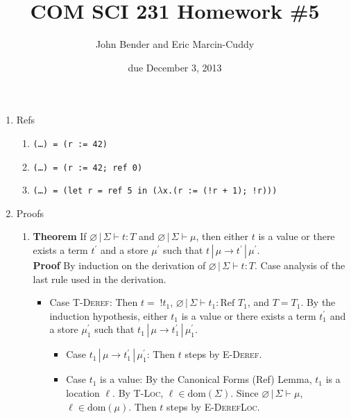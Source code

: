 \documentclass[12pt,letterpaper]{article}
\title{COM SCI 231 Homework \#5}
\author{John Bender and Eric Marcin-Cuddy}
\date{due December 3, 2013}
\begin{document}
\maketitle

\begin{enumerate}

  \item Refs
    \begin{enumerate}
      \item \texttt{(\ldots ) = (r := 42)}

      \item \texttt{(\ldots ) = (r := 42; ref 0)}

      \item \texttt{(\ldots ) = (let r = ref 5 in ($\lambda$x.(r := (!r + 1); !r)))}
    \end{enumerate}

 \item Proofs
   \begin{enumerate}

  \item \textbf{Theorem} \quad If $\varnothing \,|\, \Sigma \vdash t : T$ and $\varnothing \,|\, \Sigma \vdash \mu$, then either $t$ is a value or there exists a term $t^\prime$ and a store $\mu^\prime$ such that $t \,|\, \mu \to t^\prime \,|\, \mu^\prime$.\\
    \textbf{Proof} \quad By induction on the derivation of $\varnothing \,|\, \Sigma \vdash t : T$. Case analysis of the last rule used in the derivation.
      \begin{itemize}
      \item Case \textsc{T-Deref}: Then $t = \;!t_1$, $\varnothing \,|\, \Sigma \vdash t_1 : \text{Ref } T_1$, and $T=T_1$. By the induction hypothesis, either $t_1$ is a value or there exists a term $t_1^\prime$ and a store $\mu_1^\prime$ such that $t_1 \,|\, \mu \to t_1^\prime \,|\, \mu_1^\prime$.
        \begin{itemize}
        \item Case $t_1 \,|\, \mu \to t_1^\prime \,|\, \mu_1^\prime$: Then $t$ steps by \textsc{E-Deref}.
        \item Case $t_1$ is a value: By the Canonical Forms (Ref) Lemma, $t_1$ is a location $\ell$. By \textsc{T-Loc}, $\ell \in \text{dom}(\Sigma)$. Since $\varnothing \,|\, \Sigma \vdash \mu$, $\ell \in \text{dom}(\mu)$. Then $t$ steps by \textsc{E-DerefLoc}.
        \end{itemize}
      \end{itemize}


\end{enumerate}
\end{enumerate}
\end{document}
